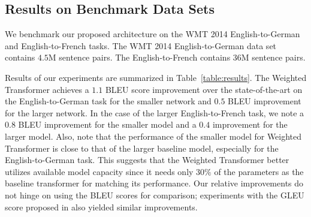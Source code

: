 \documentclass{article} %
\newcommand{\name}{Weighted Transformer\xspace}
\begin{document}
\subsection{Results on Benchmark Data Sets}

We benchmark our proposed architecture on the WMT 2014 English-to-German and English-to-French tasks. The WMT 2014 English-to-German data set contains $4.5$M sentence pairs. The English-to-French contains $36$M sentence pairs. 

Results of our experiments are summarized in Table~\ref{table:results}. The \name achieves a $1.1$ BLEU score improvement over the state-of-the-art on the English-to-German task for the smaller network and $0.5$ BLEU improvement for the larger network. In the case of the larger English-to-French task, we note a $0.8$ BLEU improvement for the smaller model and a $0.4$ improvement for the larger model. Also, note that the performance of the smaller model for \name is close to that of the larger baseline model, especially for the English-to-German task. This suggests that the \name better utilizes available model capacity since it needs only $30\%$ of the parameters as the baseline transformer for matching its performance. Our relative improvements do not hinge on using the BLEU scores for comparison; experiments with the GLEU score proposed in \citet{wu2016google} also yielded similar improvements. 

\end{document}
